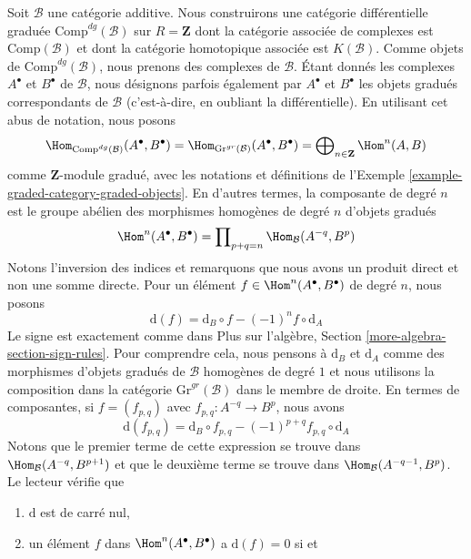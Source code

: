 \begin{example}
\label{example-category-complexes}
Soit $\mathcal{B}$ une catégorie additive. Nous construirons une catégorie
différentielle graduée $\text{Comp}^{dg}(\mathcal{B})$ sur $R = \mathbf{Z}$ dont
la catégorie associée de complexes est $\text{Comp}(\mathcal{B})$ et dont la
catégorie homotopique associée est $K(\mathcal{B})$. Comme objets de
$\text{Comp}^{dg}(\mathcal{B})$, nous prenons des complexes de $\mathcal{B}$.
Étant donnés les complexes $A^\bullet$ et $B^\bullet$ de $\mathcal{B}$, nous
désignons parfois également par $A^\bullet$ et $B^\bullet$ les objets gradués
correspondants de $\mathcal{B}$ (c’est-à-dire, en oubliant la différentielle). En
utilisant cet abus de notation, nous posons
$$
\Hom_{\text{Comp}^{dg}(\mathcal{B})}(A^\bullet, B^\bullet) =
\Hom_{\text{Gr}^{gr}(\mathcal{B})}(A^\bullet, B^\bullet) =
\bigoplus\nolimits_{n \in \mathbf{Z}} \Hom^n(A, B)
$$
comme $\mathbf{Z}$-module gradué, avec les notations et définitions de
l'Exemple \ref{example-graded-category-graded-objects}. En d'autres termes, la
composante de degré $n$ est le groupe abélien des morphismes homogènes de degré $n$
d'objets gradués
$$
\Hom^n(A^\bullet, B^\bullet) =
\prod\nolimits_{p + q = n} \Hom_\mathcal{B}(A^{-q}, B^p)
$$
Notons l'inversion des indices et remarquons que nous avons un produit direct et
non une somme directe. Pour un élément $f \in \Hom^n(A^\bullet, B^\bullet)$ de
degré $n$, nous posons
$$
\text{d}(f) = \text{d}_B \circ f - (-1)^n f \circ \text{d}_A
$$
Le signe est exactement comme dans Plus sur l'algèbre, Section
\ref{more-algebra-section-sign-rules}. Pour comprendre cela, nous pensons à
$\text{d}_B$ et $\text{d}_A$ comme des morphismes d'objets gradués de
$\mathcal{B}$ homogènes de degré $1$ et nous utilisons la composition dans la
catégorie $\text{Gr}^{gr}(\mathcal{B})$ dans le membre de droite. En termes de composantes,
si $f = (f_{p, q})$ avec $f_{p, q} : A^{-q} \to B^p$, nous avons
\begin{equation}
\label{equation-differential-hom-complex}
\text{d}(f_{p, q}) =
\text{d}_B \circ f_{p, q} - (-1)^{p + q} f_{p, q} \circ \text{d}_A 
\end{equation}
Notons que le premier terme de cette expression se trouve dans
$\Hom_\mathcal{B}(A^{-q}, B^{p + 1})$ et que le deuxième terme se trouve dans
$\Hom_\mathcal{B}(A^{-q - 1}, B^p)$. Le lecteur vérifie que
\begin{enumerate}
\item $\text{d}$ est de carré nul,
\item un élément $f$ dans $\Hom^n(A^\bullet, B^\bullet)$ a $\text{d}(f) = 0$ si et

\end{enumerate}
\end{example}
